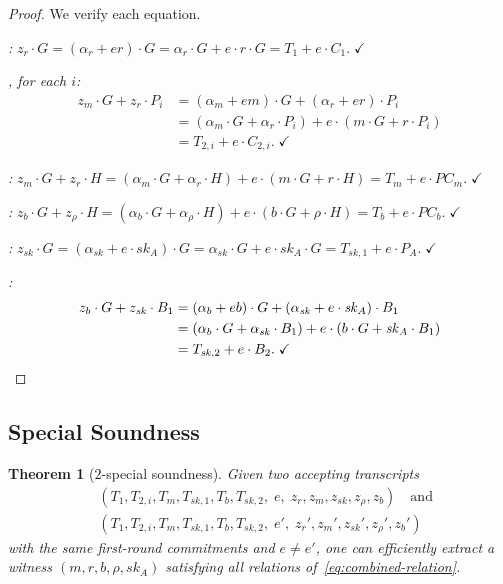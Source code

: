 \documentclass[11pt]{article}
\newtheorem{theorem}{Theorem}[section]
\theoremstyle{definition}
\newcommand{\sk}{\mathit{sk}}
\begin{document}
\begin{proof}
  We verify each equation.

  \medskip\noindent\textit{:}
  $z_r \cdot G = (\alpha_r + er) \cdot G
    = \alpha_r \cdot G + e \cdot r \cdot G
    = T_1 + e \cdot C_1.\; \checkmark$

  \medskip\noindent\textit{, for each $i$:}
  \begin{align*}
    z_m \cdot G + z_r \cdot P_i
    &= (\alpha_m + em) \cdot G + (\alpha_r + er) \cdot P_i \\
    &= (\alpha_m \cdot G + \alpha_r \cdot P_i)
       + e \cdot (m \cdot G + r \cdot P_i) \\
    &= T_{2,i} + e \cdot C_{2,i}.\; \checkmark
  \end{align*}

  \medskip\noindent\textit{:}
  $z_m \cdot G + z_r \cdot H
    = (\alpha_m \cdot G + \alpha_r \cdot H)
      + e \cdot (m \cdot G + r \cdot H)
    = T_m + e \cdot \mathit{PC}_m.\; \checkmark$

  \medskip\noindent\textit{:}
  $z_b \cdot G + z_\rho \cdot H
    = (\alpha_b \cdot G + \alpha_\rho \cdot H)
      + e \cdot (b \cdot G + \rho \cdot H)
    = T_b + e \cdot \mathit{PC}_b.\; \checkmark$

  \medskip\noindent\textit{:}
  $z_{\sk} \cdot G
    = (\alpha_{\sk} + e \cdot \sk_A) \cdot G
    = \alpha_{\sk} \cdot G + e \cdot \sk_A \cdot G
    = T_{\sk,1} + e \cdot P_A.\; \checkmark$

  \medskip\noindent\textit{:}
  \begin{align*}
    z_b \cdot G + z_{\sk} \cdot B_1
    &= (\alpha_b + eb) \cdot G + (\alpha_{\sk} + e \cdot \sk_A) \cdot B_1 \\
    &= (\alpha_b \cdot G + \alpha_{\sk} \cdot B_1)
       + e \cdot (b \cdot G + \sk_A \cdot B_1) \\
    &= T_{\sk,2} + e \cdot B_2.\; \checkmark
    \qedhere
  \end{align*}
\end{proof}

\subsection{Special Soundness}

\begin{theorem}[$2$-special soundness]
  \label{thm:soundness}
  Given two accepting transcripts
  \begin{align*}
    &(T_1, T_{2,i}, T_m, T_{\sk,1}, T_b, T_{\sk,2},\;
       e,\; z_r, z_m, z_{\sk}, z_\rho, z_b) \quad\text{and}\\
    &(T_1, T_{2,i}, T_m, T_{\sk,1}, T_b, T_{\sk,2},\;
       e',\; z_r', z_m', z_{\sk}', z_\rho', z_b')
  \end{align*}
  with the same first-round commitments and $e \ne e'$,
  one can efficiently extract a witness
  $(m, r, b, \rho, \sk_A)$ satisfying all relations
  of~\cref{eq:combined-relation}.
\end{theorem}
\end{document}
